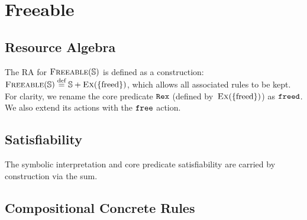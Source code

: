 

\section{Freeable} \label{rules:freeable}

\subsection{Resource Algebra}

The RA for $\textsc{Freeable}(\mathbb S)$ is defined as a construction: $\textsc{Freeable}(\mathbb S) \stackrel{\textnormal{def}}= \mathbb S + \textsc{Ex}(\{\text{freed}\})$, which allows all associated rules to be kept. For clarity, we rename the core predicate $\texttt{R}\texttt{ex}$ (defined by~$\textsc{Ex}(\{\text{freed}\})$) as $\texttt{freed}$. We also extend its actions with the $\texttt{free}$ action.

\subsection{Satisfiability}

The symbolic interpretation and core predicate satisfiability are carried by construction via the sum.

\subsection{Compositional Concrete Rules}

